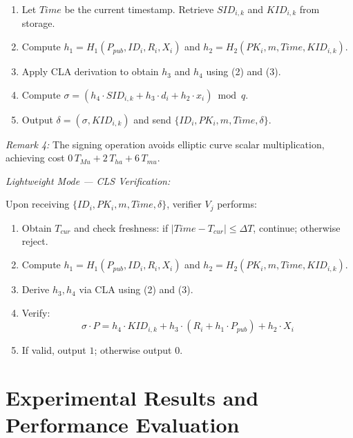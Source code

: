 \documentclass[conference]{IEEEtran}
\begin{document}
\begin{enumerate}
\item Let $Time$ be the current timestamp. Retrieve $SID_{i,k}$ and $KID_{i,k}$ from storage.

\item Compute $h_1 = H_1(P_{pub}, ID_i, R_i, X_i)$ and $h_2 = H_2(PK_i, m, Time, KID_{i,k})$.

\item Apply CLA derivation to obtain $h_3$ and $h_4$ using (2) and (3).

\item Compute $\sigma = (h_4 \cdot SID_{i,k} + h_3 \cdot d_i + h_2 \cdot x_i) \bmod q$.

\item Output $\delta = (\sigma, KID_{i,k})$ and send $\{ID_i, PK_i, m, Time, \delta\}$.
\end{enumerate}

\textit{Remark 4:} The signing operation avoids elliptic curve scalar multiplication, achieving cost $0\,T_{Mu} + 2\,T_{ha} + 6\,T_{mu}$.

\vspace{0.5em}

\noindent\textit{Lightweight Mode — CLS Verification:}

Upon receiving $\{ID_i, PK_i, m, Time, \delta\}$, verifier $V_j$ performs:

\begin{enumerate}
\item Obtain $T_{cur}$ and check freshness: if $|Time - T_{cur}| \leq \Delta T$, continue; otherwise reject.

\item Compute $h_1 = H_1(P_{pub}, ID_i, R_i, X_i)$ and $h_2 = H_2(PK_i, m, Time, KID_{i,k})$.

\item Derive $h_3, h_4$ via CLA using (2) and (3).

\item Verify:
\begin{equation}
\sigma \cdot P = h_4 \cdot KID_{i,k} + h_3 \cdot (R_i + h_1 \cdot P_{pub}) + h_2 \cdot X_i \tag{5}
\end{equation}

\item If valid, output $1$; otherwise output $0$.
\end{enumerate}

\section{Experimental Results and Performance Evaluation}
\label{sec:eval}
\end{document}
